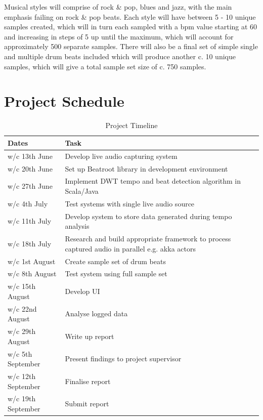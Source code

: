 \documentclass[a4paper, 11pt]{article}
\begin{document}
Musical styles will comprise of rock \& pop, blues and jazz, with the main emphasis failing on rock \& pop beats. Each style will have between 5 - 10 unique samples created, which will in turn each sampled with a bpm value starting at 60 and increasing in steps of 5 up until the maximum, which will account for approximately 500 separate samples. There will also be a final set of simple single and multiple drum beats included which will produce another c. 10 unique samples, which will give a total sample set size of c. 750 samples.

\maketitle{} 
\section{Project Schedule}

\begin{table}[]
\caption{Project Timeline} 
\centering
\begin{tabular}{|p{4cm}|p{8cm}|}
 \hline
\textbf{Dates} & \textbf{Task}\\ [0.5ex]
\hline 
w/c 13th June & Develop live audio capturing system\\
\hline 
w/c 20th June & Set up Beatroot library in development environment\\
\hline 
w/c 27th June & Implement DWT tempo and beat detection algorithm in Scala/Java\\
\hline 
w/c 4th July & Test systems with single live audio source\\
\hline 
w/c 11th July & Develop system to store data generated during tempo analysis\\
\hline 
w/c 18th July & Research and build appropriate framework to process captured audio in parallel e.g. akka actors\\
\hline 
w/c 1st August & Create sample set of drum beats\\
\hline 
w/c 8th August & Test system using full sample set\\
\hline 
w/c 15th August & Develop UI\\
\hline 
w/c 22nd August & Analyse logged data\\
\hline 
w/c 29th August & Write up report\\
\hline 
w/c 5th September & Present findings to project supervisor\\
\hline 
w/c 12th September & Finalise report\\
\hline 
w/c 19th September & Submit report\\
\hline
\end{tabular}
\end{table}
\end{document}
